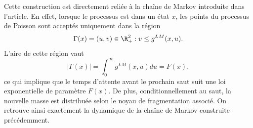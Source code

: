 Cette construction est directement reliée à la chaîne de Markov introduite dans l'article. En effet, lorsque le processus est dans un état $x$, les points du processus de Poisson sont acceptés uniquement dans la région
\[
	\Gamma(x)={(u,v)\in\R_+^2 : v\le g^{LM}(x,u)}.
\]
L'aire de cette région vaut
\[
	|\Gamma(x)|
	=
	\int_0^\infty g^{LM}(x,u)du
	=
	F(x),
\]
ce qui implique que le temps d'attente avant le prochain saut suit une loi exponentielle de paramètre $F(x)$. De plus, conditionnellement au saut, la nouvelle masse est distribuée selon le noyau de fragmentation associé. On retrouve ainsi exactement la dynamique de la chaîne de Markov construite précédemment.
